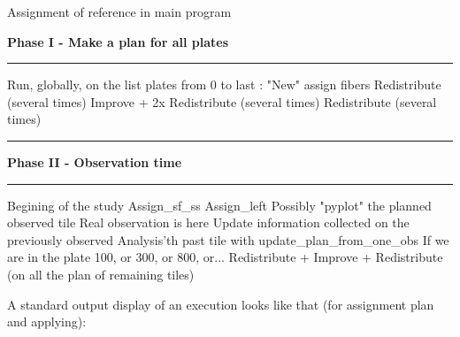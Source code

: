 \documentclass{article}
\newcommand\Algphasee[1]{%
\Statex\hspace*{-\algorithmicindent}\textbf{#1}%
\vspace*{-.7\baselineskip}\Statex\hspace*{\dimexpr-\algorithmicindent-2pt\relax}\rule{\linewidth}{0.4pt}%
}
\newcommand\Algphase[1]{%
\vspace*{-.7\baselineskip}\Statex\hspace*{\dimexpr-\algorithmicindent-2pt\relax}\rule{\linewidth}{0.4pt}%
\Statex\hspace*{-\algorithmicindent}\textbf{#1}%
\vspace*{-.7\baselineskip}\Statex\hspace*{\dimexpr-\algorithmicindent-2pt\relax}\rule{\linewidth}{0.4pt}%
}
\begin{document}
\begin{algorithm}[H]
	\caption{Assignment of reference in main program}\label{euclid}
	\begin{algorithmic}[1]
		\Algphasee{Phase I - Make a plan for all plates}
		\State Run, globally, on the list plates from 0 to last :
		\State "New" assign fibers
		\State Redistribute (several times)
		\State Improve + 2x Redistribute (several times)
		\State Redistribute (several times)
	\end{algorithmic}
	\begin{algorithmic}[1]
		\Algphase{Phase II - Observation time}
		\State Begining of the study
		\State Assign\_sf\_ss
		\State Assign\_left
		\State Possibly "pyplot" the planned observed tile
		\State Real observation is here
		\State Update information collected on the previously observed Analysis'th past tile with update\_plan\_from\_one\_obs
		\State If we are in the plate 100, or 300, or 800, or... Redistribute + Improve + Redistribute (on all the plan of remaining tiles)
		\EndFor
	\end{algorithmic}
\end{algorithm}

A standard output display of an execution looks like that (for assignment plan and applying):
\end{document}
